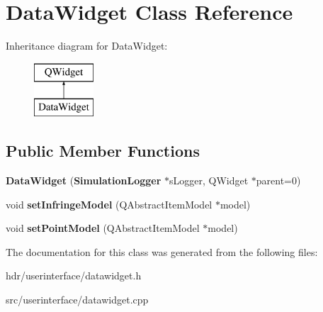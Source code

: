 \section{Data\-Widget Class Reference}
\label{class_data_widget}
Inheritance diagram for Data\-Widget\-:\begin{figure}[H]
\begin{center}
\leavevmode
\includegraphics[height=2.000000cm]{class_data_widget}
\end{center}
\end{figure}
\subsection*{Public Member Functions}
\begin{DoxyCompactItemize}
\item 
{\bfseries Data\-Widget} ({\bf Simulation\-Logger} $\ast$s\-Logger, Q\-Widget $\ast$parent=0)\label{class_data_widget_a972fb71d937e56ee9009b426eb9a35c8}

\item 
void {\bfseries set\-Infringe\-Model} (Q\-Abstract\-Item\-Model $\ast$model)\label{class_data_widget_a1301a92d6a1bcec1db954a3e9992a75e}

\item 
void {\bfseries set\-Point\-Model} (Q\-Abstract\-Item\-Model $\ast$model)\label{class_data_widget_a2b089d9e6d0a85455d740ca0c5befd50}

\end{DoxyCompactItemize}


The documentation for this class was generated from the following files\-:\begin{DoxyCompactItemize}
\item 
hdr/userinterface/datawidget.\-h\item 
src/userinterface/datawidget.\-cpp\end{DoxyCompactItemize}
